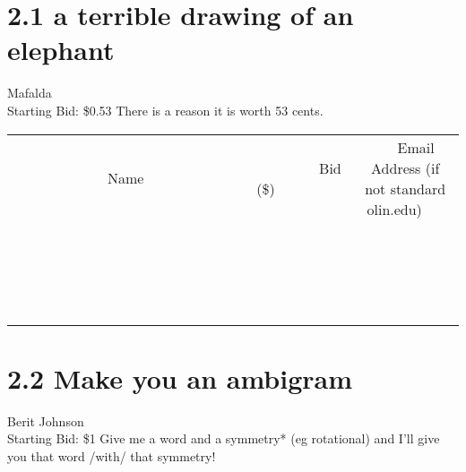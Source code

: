 \documentclass[11pt]{article}
\begin{document}
\section*{2.1 a terrible drawing of an elephant}
Mafalda
\\
Starting Bid: \$0.53
\newline
There is a reason it is worth 53 cents.
\\[3ex]
\begin{tabular}{c c c}
~~~~~~~~~~~~~Name~~~~~~~~~~~~~ & ~~~~~~~~~Bid (\$)~~~~~~~~~  & ~~~Email Address (if not standard olin.edu)~~~\\
 & & \\
\hline
 & & \\
\hline
 & & \\
\hline
 & & \\
\hline
 & & \\
\hline
 & & \\
\hline
 & & \\
\hline
 & & \\
\hline
 & & \\
\hline
 & & \\
\hline
 & & \\
\hline
 & & \\
\hline
 & & \\
\hline
 & & \\
\hline
 & & \\
\hline
 & & \\
\hline
 & & \\
\hline
 & & \\
\hline
 & & \\
\hline
\end{tabular}
\newpage
\section*{2.2 Make you an ambigram}
Berit Johnson
\\
Starting Bid: \$1
\newline
Give me a word and a symmetry* (eg rotational) and I'll give you that word /with/ that symmetry!
\end{document}
